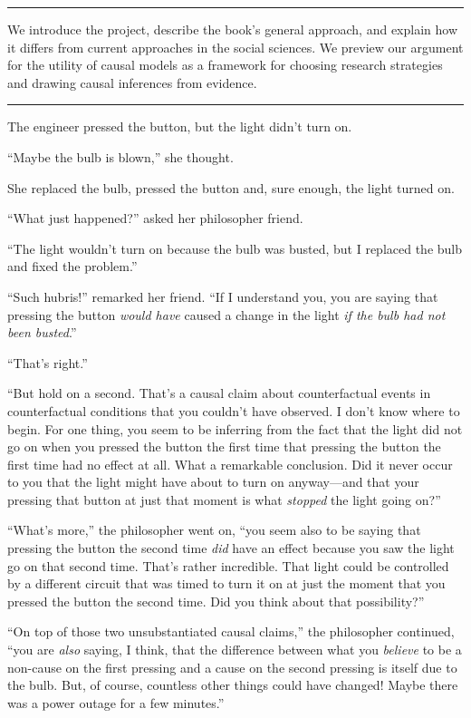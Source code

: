 \documentclass[12pt,]{book}
\begin{document}
\begin{center}\rule{0.5\linewidth}{\linethickness}\end{center}

We introduce the project, describe the book's general approach, and explain how it differs from current approaches in the social sciences. We preview our argument for the utility of causal models as a framework for choosing research strategies and drawing causal inferences from evidence.

\begin{center}\rule{0.5\linewidth}{\linethickness}\end{center}

The engineer pressed the button, but the light didn't turn on.

``Maybe the bulb is blown,'' she thought.

She replaced the bulb, pressed the button and, sure enough, the light turned on.

``What just happened?'' asked her philosopher friend.

``The light wouldn't turn on because the bulb was busted, but I replaced the bulb and fixed the problem.''

``Such hubris!'' remarked her friend. ``If I understand you, you are saying that pressing the button \emph{would have} caused a change in the light \emph{if the bulb had not been busted}.''

``That's right.''

``But hold on a second. That's a causal claim about counterfactual events in counterfactual conditions that you couldn't have observed. I don't know where to begin. For one thing, you seem to be inferring from the fact that the light did not go on when you pressed the button the first time that pressing the button the first time had no effect at all. What a remarkable conclusion. Did it never occur to you that the light might have about to turn on anyway---and that your pressing that button at just that moment is what \emph{stopped} the light going on?''

``What's more,'' the philosopher went on, ``you seem also to be saying that pressing the button the second time \emph{did} have an effect because you saw the light go on that second time. That's rather incredible. That light could be controlled by a different circuit that was timed to turn it on at just the moment that you pressed the button the second time. Did you think about that possibility?''

``On top of those two unsubstantiated causal claims,'' the philosopher continued, ``you are \emph{also} saying, I think, that the difference between what you \emph{believe} to be a non-cause on the first pressing and a cause on the second pressing is itself due to the bulb. But, of course, countless other things could have changed! Maybe there was a power outage for a few minutes.''
\end{document}
